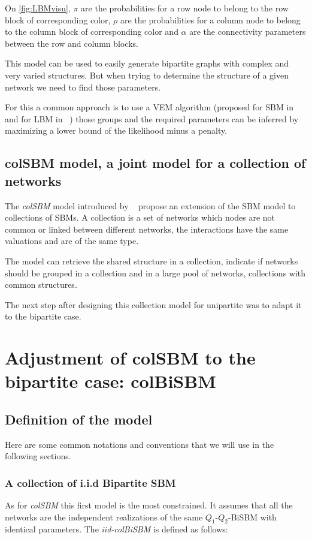 \documentclass[12pt,a4paper]{report}
\begin{document}
On \ref{fig:LBMvisu}, $\pi$ are the probabilities for a row node to belong to
the row block of corresponding color, $\rho$ are the probabilities for a column
node to belong to the column block of corresponding color and $\alpha$ are the
connectivity parameters between the row and column blocks.

This model can be used to easily generate bipartite graphs with complex and very
varied structures. But when trying to determine the structure of a given network
we need to find those parameters.

For this a common approach is to use a VEM algorithm
(proposed for SBM in ~\cite{daudinMixtureModelRandom2008} and for LBM in ~\cite{govaertEMAlgorithmBlock2005})
those groups and the required parameters can be inferred by maximizing a lower
bound of the likelihood minus a penalty.

\section{colSBM model, a joint model for a collection of networks}
\label{sec:colsbm-model-a-joint-model-for-a-collection-of-networks}
The \emph{colSBM} model introduced by ~\cite{chabert-liddellLearningCommonStructures2023}
propose an extension of the SBM model to collections of SBMs. A collection is a
set of networks which nodes are not common or linked between different networks,
the interactions have the same valuations and are of the same type.

The model can retrieve the shared structure in a collection, indicate
if networks should be grouped in a collection and  in a large pool of networks,
collections with common structures.

The next step after designing this collection model for unipartite was to adapt
it to the bipartite case.

\chapter{Adjustment of colSBM to the bipartite case: colBiSBM}

\section{Definition of the model}
\label{sec:definition-of-the-model}
Here are some common notations and conventions that we will use in the following
sections.

\subsection{A collection of i.i.d Bipartite SBM}
\label{ssec:a-collection-of-i-i-d-bipartite-sbm}
As for \emph{colSBM} this first model is the most constrained. It assumes
that all the networks are the independent realizations of the same $Q_1$-$Q_2$-BiSBM
with identical parameters. The \emph{iid-colBiSBM} is defined as follows:
\end{document}
